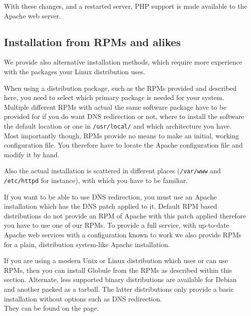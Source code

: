 \documentclass[10pt,a4paper]{article}
\makeatletter
\newenvironment{p}{\@open{P}{}}{\@close{P}}
\newenvironment{p}{}{\par}
\newcommand\subsectionbr{}
\makeatother
\begin{document}
\begin{p}
With these changes, and a restarted server, PHP support is made available to
the Apache web server.
\end{p}


\newpage
\subsection{\label{sec:install:rpm}
  Installation from RPMs and alikes\subsectionbr}

\begin{p}
We provide also alternative installation methods, which require more
experience with the packages your Linux distribution uses.
\end{p}

\begin{p}
When using a distribution package, such as the RPMs provided and described
here, you need to select which primary package is needed for your system.
Multiple different RPMs with actual the same software package have to be
provided for if you do want DNS redirection or not, where to install the
software the default location or one in \verb!/usr/local/! and which
architecture you have.  Most importantly though, RPMs provide no means to make
an initial, working configuration file.  You therefore have to locate the
Apache configuration file and modify it by hand.
\end{p}

\begin{p}
Also the actual installation is scattered in different places
(\texttt{/var/www} and \texttt{/etc/httpd} for instance), with which you have
to be familiar.
\end{p}

\begin{p}
If you want to be able to use DNS redirection, you must use an Apache
installation which has the DNS patch applied to it.  Default RPM based
distributions do not provide an RPM of Apache with this patch applied therefore
you have to use one of our RPMs.  To provide a full service, with up-to-date
Apache web services with a configuration known to work we also provide RPMs
for a plain, distribution system-like Apache installation.
\end{p}

\begin{p}
If you are using a modern Unix or Linux distribution which uses or can use
RPMs, then you can install Globule from the RPMs as described within this
section.  Alternate, less supported binary distributions are available for
Debian and another packed as a tarball.  The latter distributions only provide
a basic installation without options such as DNS redirection. \\
They can be found on the 
page.
\end{p}
\end{document}
